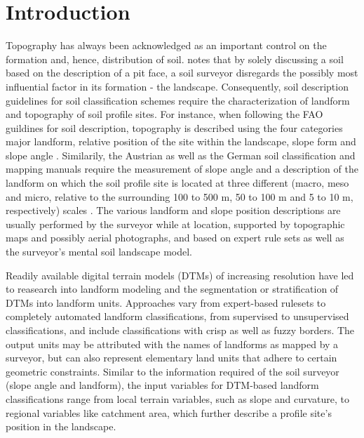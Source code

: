 \documentclass[preprint,12pt,authoryear]{elsarticle}
\begin{document}
\linenumbers

\section{Introduction}
Topography has always been acknowledged as an important control on the formation and, hence, distribution of soil. \cite{Schaetzl2013} notes that by solely discussing a soil based on the description of a pit face, a soil surveyor disregards the possibly most influential factor in its formation - the landscape.	Consequently, soil description guidelines for soil classification schemes require the characterization of landform and topography of soil profile sites. For instance, when following the FAO guildines for soil description, topography is described using the four categories major landform, relative position of the site within the landscape, slope form and slope angle \citep{FAO2006}. Similarily, the Austrian \citep{Nestroy2011} as well as the German soil classification and mapping manuals \citep{ArbeitsgruppeBoden2006} require the measurement of slope angle and a description of the landform on which the soil profile site is located at three different (macro, meso and micro, relative to the surrounding 100 to 500 m, 50 to 100 m and 5 to 10 m, respectively) scales \citep{Englisch1998}. The various landform and slope position descriptions are usually performed by the surveyor while at location, supported by topographic maps and possibly aerial photographs, and based on expert rule sets as well as the surveyor's mental soil landscape model. 

Readily available digital terrain models (DTMs) of increasing resolution have led to reasearch into landform modeling and the segmentation or stratification  of DTMs into landform units. Approaches vary from expert-based rulesets to completely automated landform classifications, from supervised to unsupervised classifications, and include classifications with crisp as well as fuzzy borders.  The output units may be attributed with the names of landforms as mapped by a surveyor, but can also represent elementary land units that adhere to certain geometric constraints. Similar to the information required of the soil surveyor (slope angle and landform), the input variables for DTM-based landform classifications range from local terrain variables, such as slope and curvature, to regional variables like catchment area, which further describe a profile site's position in the landscape.
\end{document}
